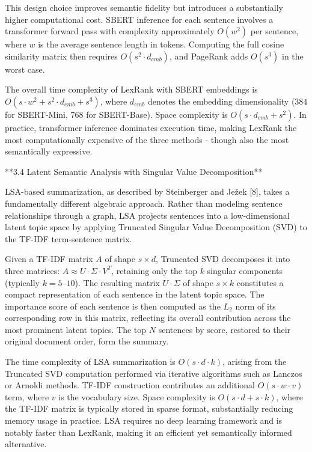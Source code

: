 \documentclass[10pt]{book}
\begin{document}
This design choice improves semantic fidelity but introduces a substantially higher computational cost. SBERT inference for each sentence involves a transformer forward pass with complexity approximately $O(w^2)$ per sentence, where $w$ is the average sentence length in tokens. Computing the full cosine similarity matrix then requires $O(s^2 \cdot d_{emb})$, and PageRank adds $O(s^3)$ in the worst case.

The overall time complexity of LexRank with SBERT embeddings is $O(s \cdot w^2 + s^2 \cdot d_{emb} + s^3)$, where $d_{emb}$ denotes the embedding dimensionality ($384$ for SBERT-Mini, $768$ for SBERT-Base). Space complexity is $O(s \cdot d_{emb} + s^2)$. In practice, transformer inference dominates execution time, making LexRank the most computationally expensive of the three methods - though also the most semantically expressive.

**3.4 Latent Semantic Analysis with Singular Value Decomposition**

LSA-based summarization, as described by Steinberger and Ježek [8], takes a fundamentally different algebraic approach. Rather than modeling sentence relationships through a graph, LSA projects sentences into a low-dimensional latent topic space by applying Truncated Singular Value Decomposition (SVD) to the TF-IDF term-sentence matrix.

Given a TF-IDF matrix $A$ of shape $s \times d$, Truncated SVD decomposes it into three matrices: $A \approx U \cdot \Sigma \cdot V^T$, retaining only the top $k$ singular components (typically $k = 5$–$10$). The resulting matrix $U \cdot \Sigma$ of shape $s \times k$ constitutes a compact representation of each sentence in the latent topic space. The importance score of each sentence is then computed as the $L_2$ norm of its corresponding row in this matrix, reflecting its overall contribution across the most prominent latent topics. The top $N$ sentences by score, restored to their original document order, form the summary.

The time complexity of LSA summarization is $O(s \cdot d \cdot k)$, arising from the Truncated SVD computation performed via iterative algorithms such as Lanczos or Arnoldi methods. TF-IDF construction contributes an additional $O(s \cdot w \cdot v)$ term, where $v$ is the vocabulary size. Space complexity is $O(s \cdot d + s \cdot k)$, where the TF-IDF matrix is typically stored in sparse format, substantially reducing memory usage in practice. LSA requires no deep learning framework and is notably faster than LexRank, making it an efficient yet semantically informed alternative.
\end{document}
